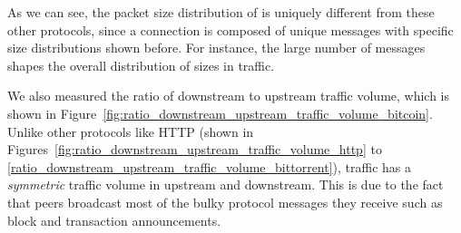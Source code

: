 As we can see, 
the packet size distribution of \bc is uniquely different from these other protocols, since a \bc connection is composed of unique messages with specific size distributions shown before. For instance, the large number of  messages shapes the overall distribution of sizes in \bc traffic. 

 

We also measured the ratio of downstream to upstream traffic volume, which is shown in Figure~\ref{fig:ratio_downstream_upstream_traffic_volume_bitcoin}.
Unlike other protocols like HTTP (shown in
Figures~\ref{fig:ratio_downstream_upstream_traffic_volume_http} to \ref{ratio_downstream_upstream_traffic_volume_bittorrent}),
\bc traffic has a \emph{symmetric} traffic volume in upstream and downstream. 
This is due to the fact that \bc peers broadcast most of the bulky protocol messages they receive such as block and transaction announcements. 


